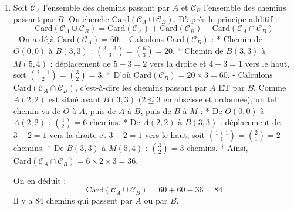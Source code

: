 \begin{enumerate}
    \item Soit $\mathcal{C}_A$ l'ensemble des chemins passant par $A$ et $\mathcal{C}_B$ l'ensemble des chemins passant par $B$. On cherche $\text{Card}(\mathcal{C}_A \cup \mathcal{C}_B)$.
    D'après le principe additif :
    \[
    \text{Card}(\mathcal{C}_A \cup \mathcal{C}_B) = \text{Card}(\mathcal{C}_A) + \text{Card}(\mathcal{C}_B) - \text{Card}(\mathcal{C}_A \cap \mathcal{C}_B)
    \]
    - On a déjà $\text{Card}(\mathcal{C}_A) = 60$.
    - Calculons $\text{Card}(\mathcal{C}_B)$ :
      * Chemin de $O(0,0)$ à $B(3,3)$ : $\binom{3+3}{3} = \binom{6}{3} = 20$.
      * Chemin de $B(3,3)$ à $M(5,4)$ : déplacement de $5-3=2$ vers la droite et $4-3=1$ vers le haut, soit $\binom{2+1}{2} = \binom{3}{2} = 3$.
      * D'où $\text{Card}(\mathcal{C}_B) = 20 \times 3 = 60$.
    - Calculons $\text{Card}(\mathcal{C}_A \cap \mathcal{C}_B)$, c'est-à-dire les chemins passant par $A$ ET par $B$. Comme $A(2,2)$ est situé avant $B(3,3)$ ($2 \le 3$ en abscisse et ordonnée), un tel chemin va de $O$ à $A$, puis de $A$ à $B$, puis de $B$ à $M$ :
      * De $O(0,0)$ à $A(2,2)$ : $\binom{4}{2} = 6$ chemins.
      * De $A(2,2)$ à $B(3,3)$ : déplacement de $3-2=1$ vers la droite et $3-2=1$ vers le haut, soit $\binom{1+1}{1} = \binom{2}{1} = 2$ chemins.
      * De $B(3,3)$ à $M(5,4)$ : $\binom{3}{2} = 3$ chemins.
      * Ainsi, $\text{Card}(\mathcal{C}_A \cap \mathcal{C}_B) = 6 \times 2 \times 3 = 36$.
      
    On en déduit :
    \[
    \text{Card}(\mathcal{C}_A \cup \mathcal{C}_B) = 60 + 60 - 36 = 84
    \]
    Il y a 84 chemins qui passent par $A$ ou par $B$.
\end{enumerate}

